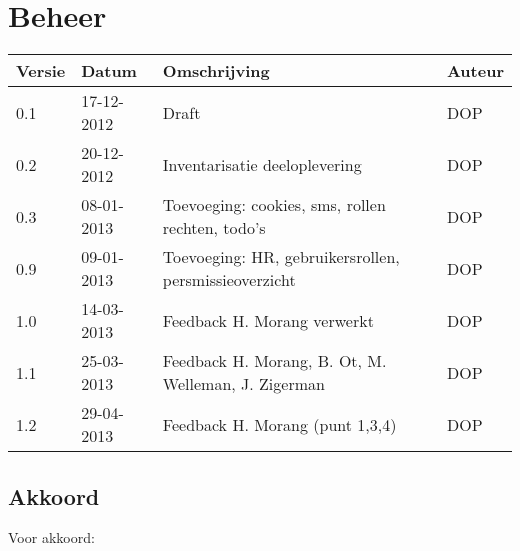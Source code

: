 \section{Beheer}

\begin{tabularx}{\linewidth}{| p{2.5cm} | p{2.5cm} | X | p{2.5cm} |}
\rowcolor{tableheader}
\hline
\textbf{Versie} & \textbf{Datum} & \textbf{Omschrijving} &  \textbf{Auteur}			\\ \hline
0.1 & 17-12-2012 & Draft 											& DOP			\\ \hline
0.2 & 20-12-2012 & Inventarisatie deeloplevering 						& DOP			\\ \hline
0.3 & 08-01-2013 & Toevoeging: cookies, sms, rollen rechten, todo's					& DOP			\\ \hline
0.9 & 09-01-2013 & Toevoeging: HR, gebruikersrollen, persmissieoverzicht & DOP \\ \hline
1.0 & 14-03-2013 & Feedback H. Morang verwerkt & DOP \\ \hline
1.1 & 25-03-2013 & Feedback H. Morang, B. Ot, M. Welleman, J. Zigerman & DOP\\ \hline
1.2 & 29-04-2013 & Feedback H. Morang (punt 1,3,4) & DOP\\ \hline
\end{tabularx}

\subsection{Akkoord}
Voor akkoord:\\ \\

